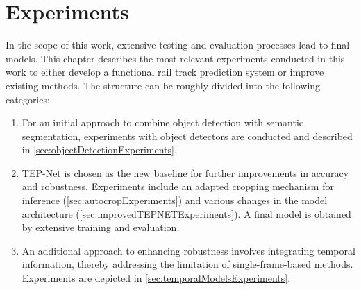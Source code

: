 \chapter{Experiments}
\label{sec:experiments}


In the scope of this work, extensive testing and evaluation processes lead to final models.
This chapter describes the most relevant experiments conducted in this work to either develop a functional rail track prediction system or improve existing methods.
The structure can be roughly divided into the following categories:

\begin{enumerate}
    \item For an initial approach to combine object detection with semantic segmentation, experiments with object detectors are conducted and described in \autoref{sec:objectDetectionExperiments}.
    \item TEP-Net \cite{tepNet2024} is chosen as the new baseline for further improvements in accuracy and robustness. Experiments include an adapted cropping mechanism for inference (\autoref{sec:autocropExperiments}) and various changes in the model architecture (\autoref{sec:improvedTEPNETExperiments}). A final model is obtained by extensive training and evaluation.
    \item An additional approach to enhancing robustness involves integrating temporal information, thereby addressing the limitation of single-frame-based methods. Experiments are depicted in \autoref{sec:temporalModelsExperiments}. 
\end{enumerate}












